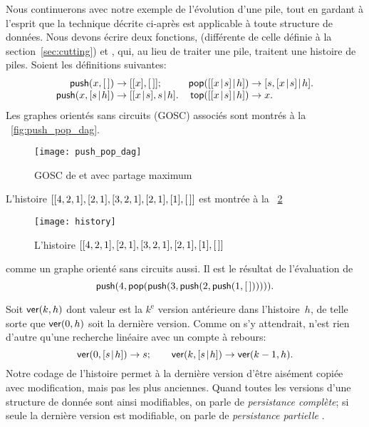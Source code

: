Nous continuerons avec notre exemple de l'évolution d'une pile, tout
en gardant à l'esprit que la technique décrite ci-après est applicable
à toute structure de données. Nous devons écrire deux fonctions,
 (différente de celle définie à
la section~\ref{sec:cutting}) et ,
qui, au lieu de traiter une pile, traitent une histoire de
piles. Soient les définitions suivantes:
\begin{equation}
\begin{array}{@{}r@{\;}c@{\;}l@{\quad}r@{\;}c@{\;}l@{}}
\fun{push}(x,\el) & \rightarrow & [[x],\el];
& \fun{pop}(\cons{\cons{x}{s}}{h}) & \rightarrow &
                                     \cons{s,\cons{x}{s}}{h}.\\
\fun{push}(x,\cons{s}{h}) & \rightarrow &
\cons{\cons{x}{s},s}{h}. &
\fun{top}(\cons{\cons{x}{s}}{h}) & \rightarrow & x.
\end{array}
\label{eq_push_pop_persistence}
\end{equation}
Les graphes orientés sans circuits (GOSC) associés sont montrés à la
\fig~\vref{fig:push_pop_dag}.
\begin{figure}[b]
\centering
\texttt{[image: push\_pop\_dag]}
\caption{GOSC de  et  avec partage maximum}
\label{fig:push_pop_dag}
\end{figure}
L'histoire \([[4,2,1],[2,1],[3,2,1],[2,1],[1],[\,]]\) est montrée
à la \fig~\ref{fig:history}
\begin{figure}
\centering
\texttt{[image: history]}
\caption{L'histoire \([[4,2,1],[2,1],[3,2,1],[2,1],[1],[\,]]\)}
\label{fig:history}
\end{figure}
comme un graphe orienté sans circuits aussi. Il est le résultat de
l'évaluation de
\begin{equation}
\textsf{push}(4, \textsf{pop}(\textsf{push}(3, \textsf{push}(2,
\textsf{push}(1, [\,]))))).
\label{ex_history}
\end{equation}

Soit \(\textsf{ver}(k,h)\)  dont valeur est la
\(k^\text{e}\) version antérieure dans l'histoire~\(h\), de telle
sorte que \(\textsf{ver}(0,h)\) soit la dernière version. Comme on s'y
attendrait,  n'est rien d'autre qu'une recherche linéaire
avec un compte à rebours:
\begin{equation*}
\abovedisplayskip=3pt
\belowdisplayskip=3pt
\fun{ver}(0,\cons{s}{h}) \rightarrow s;\qquad
\fun{ver}(k,\cons{s}{h}) \rightarrow \fun{ver}(k-1,h).
\end{equation*}
Notre codage de l'histoire permet à la dernière version d'être
aisément copiée avec modification, mais pas les plus anciennes. Quand
toutes les versions d'une structure de donnée sont ainsi modifiables,
on parle de \emph{persistance complète}; si seule la dernière version est modifiable, on parle de
\emph{persistance partielle}
\citep{MehlhornTsakalidis_1990}.

